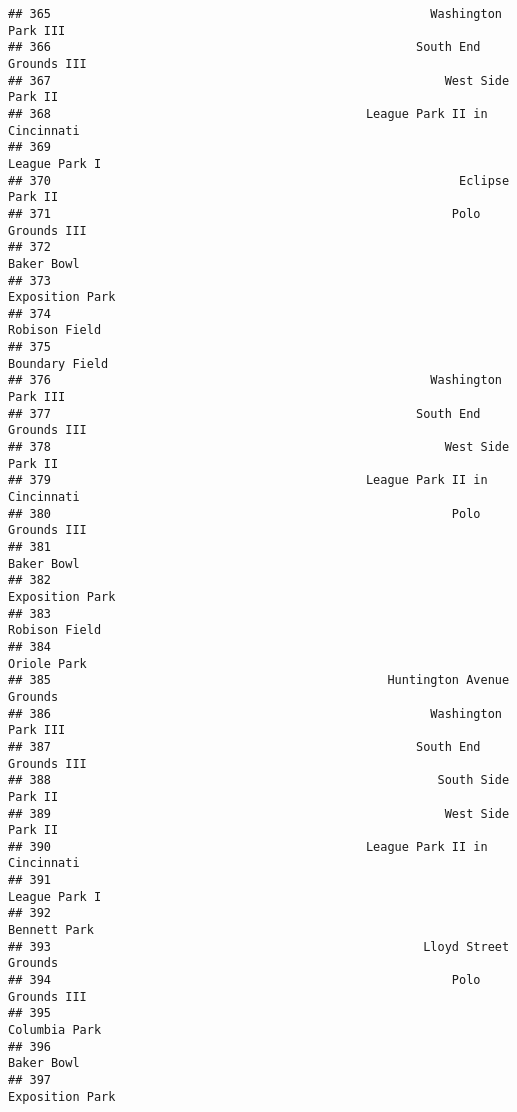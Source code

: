 \documentclass[]{article}
\begin{document}
\begin{verbatim}
## 365                                                     Washington Park III
## 366                                                   South End Grounds III
## 367                                                       West Side Park II
## 368                                            League Park II in Cincinnati
## 369                                                           League Park I
## 370                                                         Eclipse Park II
## 371                                                        Polo Grounds III
## 372                                                              Baker Bowl
## 373                                                         Exposition Park
## 374                                                           Robison Field
## 375                                                          Boundary Field
## 376                                                     Washington Park III
## 377                                                   South End Grounds III
## 378                                                       West Side Park II
## 379                                            League Park II in Cincinnati
## 380                                                        Polo Grounds III
## 381                                                              Baker Bowl
## 382                                                         Exposition Park
## 383                                                           Robison Field
## 384                                                             Oriole Park
## 385                                               Huntington Avenue Grounds
## 386                                                     Washington Park III
## 387                                                   South End Grounds III
## 388                                                      South Side Park II
## 389                                                       West Side Park II
## 390                                            League Park II in Cincinnati
## 391                                                           League Park I
## 392                                                            Bennett Park
## 393                                                    Lloyd Street Grounds
## 394                                                        Polo Grounds III
## 395                                                           Columbia Park
## 396                                                              Baker Bowl
## 397                                                         Exposition Park

\end{verbatim}
\end{document}
